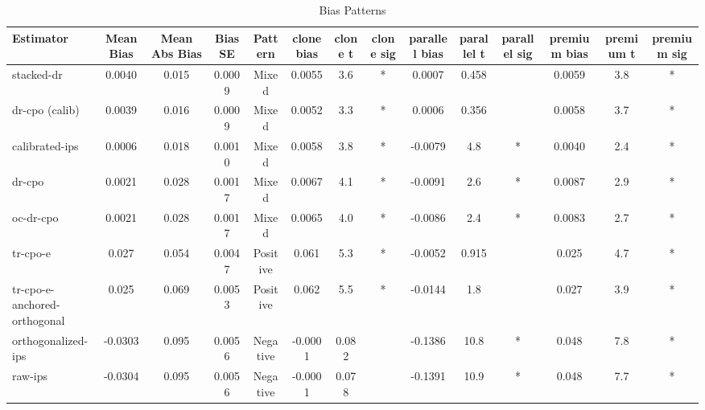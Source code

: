 \begin{table}[htbp]
\centering
\caption{Bias Patterns}
\label{tab:A2}
\begin{tabular}{l|ccccccccccccc}
\toprule
Estimator & Mean Bias & Mean Abs Bias & Bias SE & Pattern & clone bias & clone t & clone sig & parallel bias & parallel t & parallel sig & premium bias & premium t & premium sig \\
\midrule
stacked-dr & 0.0040 & 0.015 & 0.0009 & Mixed & 0.0055 & 3.6 & * & 0.0007 & 0.458 &  & 0.0059 & 3.8 & * \\
dr-cpo (calib) & 0.0039 & 0.016 & 0.0009 & Mixed & 0.0052 & 3.3 & * & 0.0006 & 0.356 &  & 0.0058 & 3.7 & * \\
calibrated-ips & 0.0006 & 0.018 & 0.0010 & Mixed & 0.0058 & 3.8 & * & -0.0079 & 4.8 & * & 0.0040 & 2.4 & * \\
dr-cpo & 0.0021 & 0.028 & 0.0017 & Mixed & 0.0067 & 4.1 & * & -0.0091 & 2.6 & * & 0.0087 & 2.9 & * \\
oc-dr-cpo & 0.0021 & 0.028 & 0.0017 & Mixed & 0.0065 & 4.0 & * & -0.0086 & 2.4 & * & 0.0083 & 2.7 & * \\
tr-cpo-e & 0.027 & 0.054 & 0.0047 & Positive & 0.061 & 5.3 & * & -0.0052 & 0.915 &  & 0.025 & 4.7 & * \\
tr-cpo-e-anchored-orthogonal & 0.025 & 0.069 & 0.0053 & Positive & 0.062 & 5.5 & * & -0.0144 & 1.8 &  & 0.027 & 3.9 & * \\
orthogonalized-ips & -0.0303 & 0.095 & 0.0056 & Negative & -0.0001 & 0.082 &  & -0.1386 & 10.8 & * & 0.048 & 7.8 & * \\
raw-ips & -0.0304 & 0.095 & 0.0056 & Negative & -0.0001 & 0.078 &  & -0.1391 & 10.9 & * & 0.048 & 7.7 & * \\
\bottomrule
\end{tabular}
\end{table}